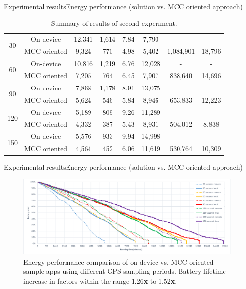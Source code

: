 \documentclass[8pt,xcolor={dvipsnames},handout]{beamer}
\begin{document}
\begin{frame}{Experimental results}{Energy performance (solution vs. MCC oriented approach)}
\begin{table}
{\begin{tabular}{@{}cccccccc@{}}
\multirow{2}{*}{30}  & On-device   &  12,341 & 1,614 & 7.84  & 7,790 & - & - \\
                          & MCC oriented &  9,324 &   770 & 4.98  & 5,402 & 1,084,901 & 18,796 \\
\cmidrule(l){2-8}
\multirow{2}{*}{60}  & On-device    & 10,816 & 1,219 & 6.76 & 12,028 & - & - \\
                          & MCC oriented &  7,205 &   764 & 6.45 &  7,907 & 838,640 & 14,696 \\
\cmidrule(l){2-8}
\multirow{2}{*}{90}  & On-device    & 7,868 & 1,178 & 8.91 & 13,075 & - & - \\
                          & MCC oriented & 5,624 &   546 & 5.84 &  8,946 & 653,833 & 12,223 \\
\cmidrule(l){2-8}
\multirow{2}{*}{120} & On-device    & 5,189 & 809 & 9.26 & 11,289 & - & - \\
                          & MCC oriented & 4,332 & 387 & 5.43 &  8,931 & 504,012 & 8,838 \\
\cmidrule(l){2-8}
\multirow{2}{*}{150} & On-device    & 5,576 & 933 & 9.94 & 14,998 & - & - \\
                          & MCC oriented & 4,564 & 452 & 6.06 & 11,619 & 530,764 & 10,309 \\
\bottomrule
\end{tabular}%
}
\caption{Summary of results of second experiment.}
\label{tbl:experiment-2}
\end{table}
\end{frame}

\begin{frame}{Experimental results}{Energy performance (solution vs. MCC oriented approach)}
\begin{figure}
  \centering
  \includegraphics[width=\columnwidth]{vectors/plot-energy-performance-r2}
  \caption{Energy performance comparison of on-device vs. MCC oriented sample apps using different GPS sampling periods. Battery lifetime increase in factors within the range 1.26\textbf{x} to 1.52\textbf{x}.}
  \label{fig:plot-energy-performance}
\end{figure}
\end{frame}
\end{document}
